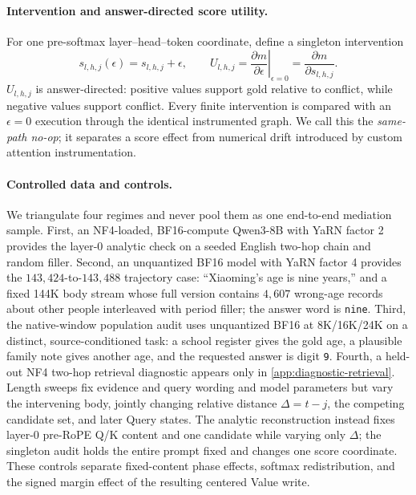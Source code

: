 \paragraph{Intervention and answer-directed score utility.}
For one pre-softmax layer--head--token coordinate, define a singleton intervention
\begin{equation}
  s_{l,h,j}(\epsilon)=s_{l,h,j}+\epsilon,
  \qquad
  U_{l,h,j}=\left.\frac{\partial m}{\partial\epsilon}\right|_{\epsilon=0}
  =\frac{\partial m}{\partial s_{l,h,j}}.
  \label{eq:score-intervention}
\end{equation}
$U_{l,h,j}$ is answer-directed: positive values support gold relative to conflict,
while negative values support conflict.  Every finite intervention is compared
with an $\epsilon=0$ execution through the identical instrumented graph.  We
call this the \emph{same-path no-op}; it separates a score effect from numerical
drift introduced by custom attention instrumentation.

\paragraph{Controlled data and controls.}
We triangulate four regimes and never pool them as one end-to-end mediation
sample.  First, an NF4-loaded, BF16-compute Qwen3-8B with YaRN factor 2 provides
the layer-0 analytic check on a seeded English two-hop chain and random filler.
Second, an unquantized BF16 model with YaRN factor 4 provides the
$143{,}424$-to-$143{,}488$ trajectory case: ``Xiaoming's age is nine years,''
and a fixed 144K body stream whose full version contains $4{,}607$ wrong-age
records about other people interleaved with period filler; the answer word is
\texttt{nine}.  Third, the native-window population audit uses unquantized BF16
at 8K/16K/24K on a distinct, source-conditioned task: a school register gives
the gold age, a plausible family note gives another age, and the requested
answer is digit \texttt{9}.  Fourth, a held-out NF4 two-hop retrieval diagnostic
appears only in \cref{app:diagnostic-retrieval}.  Length sweeps fix evidence and
query wording and model parameters but vary the intervening body, jointly
changing relative distance $\Delta=t-j$, the competing candidate set, and later
Query states.  The analytic reconstruction instead fixes layer-0 pre-RoPE Q/K
content and one candidate while varying only $\Delta$; the singleton audit holds
the entire prompt fixed and changes one score coordinate.  These controls
separate fixed-content phase effects, softmax redistribution, and the signed
margin effect of the resulting centered Value write.

